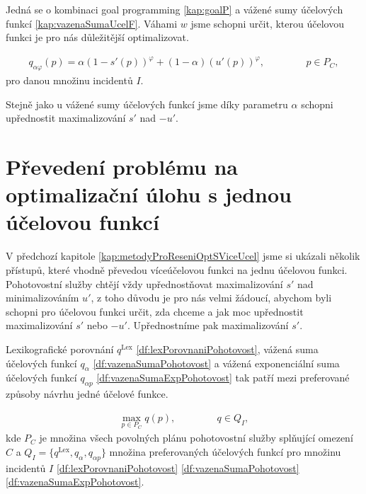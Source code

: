 Jedná se o kombinaci goal programming \ref{kap:goalP} a vážené sumy účelových funkcí \ref{kap:vazenaSumaUcelF}.
Váhami $w$ jsme schopni určit, kterou účelovou funkci je pro nás důležitější optimalizovat.

\begin{definice}\label{df:vazenaSumaExpPohotovost}
  \begin{align*}
    q_{\alpha \varphi}(p) = \alpha (1 - s'(p))^\varphi + (1 - \alpha)(u'(p))^\varphi, \hspace{50pt} p \in P_C,
  \end{align*}
  pro danou množinu incidentů $I$.
\end{definice}

Stejně jako u vážené sumy účelových funkcí jsme díky parametru $\alpha$ schopni upřednostit maximalizování $s'$ nad $-u'$.

\section{Převedení problému na optimalizační úlohu s jednou účelovou funkcí}\label{kap:opt1Uc}

V předchozí kapitole \ref{kap:metodyProReseniOptSViceUcel} jsme si ukázali několik přístupů, které vhodně převedou víceúčelovou funkci na jednu účelovou funkci.
Pohotovostní služby chtějí vždy upřednostňovat maximalizování $s'$ nad minimalizováním $u'$,
z toho důvodu je pro nás velmi žádoucí, abychom byli schopni pro účelovou funkci určit, zda chceme a jak moc upřednostit maximalizování $s'$ nebo $-u'$.
Upřednostníme pak maximalizování $s'$.

Lexikografické porovnání $q^{\text{Lex}}$ \ref{df:lexPorovnaniPohotovost}, vážená suma účelových funkcí $q_{\alpha}$ \ref{df:vazenaSumaPohotovost} a
vážená exponenciální suma účelových funkcí $q_{\alpha p}$ \ref{df:vazenaSumaExpPohotovost} tak patří mezi preferované způsoby návrhu jedné účelové funkce.

\begin{definice}\label{df:optUloha1uc}
  \begin{align*}
    \max_{p \in P_C} q(p), \hspace{50pt} q \in Q_I,
  \end{align*}
  kde $P_C$ je množina všech povolných plánu pohotovostní služby splňující omezení $C$
  a $Q_I = \{ q^{\text{Lex}}, q_{\alpha}, q_{\alpha p}\}$ množina preferovaných účelových funkcí pro množinu incidentů $I$ \ref{df:lexPorovnaniPohotovost} \ref{df:vazenaSumaPohotovost} \ref{df:vazenaSumaExpPohotovost}.
\end{definice}

